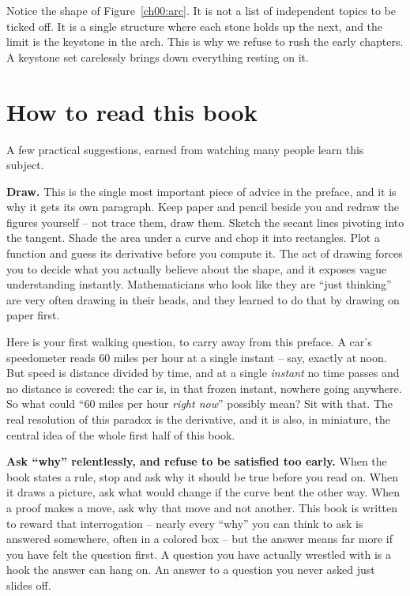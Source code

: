 \begin{aestheticbox}
Notice the shape of Figure~\ref{ch00:arc}. It is not a list of independent topics to be ticked off.
It is a single structure where each stone holds up the next, and the limit is the keystone in the
arch. This is why we refuse to rush the early chapters. A keystone set carelessly brings down
everything resting on it.
\end{aestheticbox}

\section*{How to read this book}

A few practical suggestions, earned from watching many people learn this subject.

\textbf{Draw.} This is the single most important piece of advice in the preface, and it is why it
gets its own paragraph. Keep paper and pencil beside you and redraw the figures yourself -- not trace
them, draw them. Sketch the secant lines pivoting into the tangent. Shade the area under a curve and
chop it into rectangles. Plot a function and guess its derivative before you compute it. The act of
drawing forces you to decide what you actually believe about the shape, and it exposes vague
understanding instantly. Mathematicians who look like they are ``just thinking'' are very often
drawing in their heads, and they learned to do that by drawing on paper first.

\begin{walkbox}
Here is your first walking question, to carry away from this preface. A car's speedometer reads
$60$ miles per hour at a single instant -- say, exactly at noon. But speed is distance divided by
time, and at a single \emph{instant} no time passes and no distance is covered: the car is, in that
frozen instant, nowhere going anywhere. So what could ``$60$ miles per hour \emph{right now}''
possibly mean? Sit with that. The real resolution of this paradox is the derivative, and it is
also, in miniature, the central idea of the whole first half of this book.
\end{walkbox}

\textbf{Ask ``why'' relentlessly, and refuse to be satisfied too early.} When the book states a rule,
stop and ask why it should be true before you read on. When it draws a picture, ask what would change
if the curve bent the other way. When a proof makes a move, ask why that move and not another. This
book is written to reward that interrogation -- nearly every ``why'' you can think to ask is answered
somewhere, often in a colored box -- but the answer means far more if you have felt the question
first. A question you have actually wrestled with is a hook the answer can hang on. An answer to a
question you never asked just slides off.

